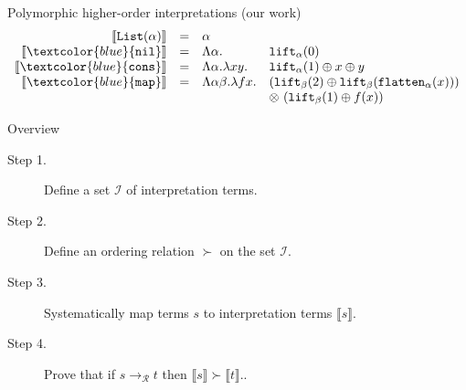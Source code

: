 \documentclass[10pt,presentation,color=names]{beamer}
\newcommand{\Rules}{\mathcal{R}}
\newcommand{\Iterms}{\mathcal{I}}
\newcommand{\red}{\longrightarrow}
\newcommand{\flatten}{\mathtt{flatten}}
\newcommand{\lift}{\mathtt{lift}}
\newcommand{\typeinterpret}[1]{\llbracket #1 \rrbracket}
\newcommand{\interpret}[1]{\llbracket #1 \rrbracket}
\newcommand{\symb}[1]{\textcolor{blue}{\mathtt{#1}}}
\newcommand{\List}{\mathtt{List}}
\newcommand{\nil}{\symb{nil}}
\newcommand{\cons}{\symb{cons}}
\newcommand{\map}{\symb{map}}
\begin{document}
\begin{frame}{Polymorphic higher-order interpretations (our work)}
\[
\begin{array}{rcll}
\typeinterpret{\List(\alpha)} & = & \alpha \\
\interpret{\nil} & = & \Lambda \alpha. & \lift_\alpha(0) \\
\interpret{\cons} & = & \Lambda \alpha.\lambda xy. & \lift_\alpha(1) \oplus x \oplus y \\
\interpret{\map} & = & \Lambda \alpha\beta.\lambda f x. & (\lift_\beta(2) \oplus \lift_\beta(\flatten_\alpha(x))) \\
  & & & \otimes\ (\lift_\beta(1) \oplus f(x)) \\
\end{array}
\]
\end{frame}

\begin{frame}{Overview}
\begin{description}
\item[Step 1.] Define a set $\Iterms$ of \alert{interpretation terms}.
\item[Step 2.] Define an ordering relation $\succ$ on the set $\Iterms$.
\item[Step 3.] Systematically map terms $s$ to interpretation terms $\interpret{s}$.
\item[Step 4.] Prove that if $s \red_{\Rules} t$ then $\interpret{s} \succ \interpret{t}$..
\end{description}
\end{frame}
\end{document}

